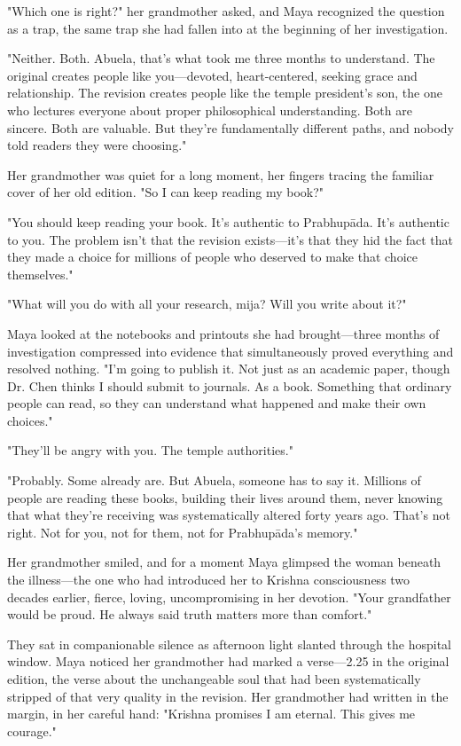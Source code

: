 \documentclass[12pt,twoside]{book}
\begin{document}
"Which one is right?" her grandmother asked, and Maya recognized the question as a trap, the same trap she had fallen into at the beginning of her investigation.

"Neither. Both. Abuela, that's what took me three months to understand. The original creates people like you—devoted, heart-centered, seeking grace and relationship. The revision creates people like the temple president's son, the one who lectures everyone about proper philosophical understanding. Both are sincere. Both are valuable. But they're fundamentally different paths, and nobody told readers they were choosing."

Her grandmother was quiet for a long moment, her fingers tracing the familiar cover of her old edition. "So I can keep reading my book?"

"You should keep reading your book. It's authentic to Prabhupāda. It's authentic to you. The problem isn't that the revision exists—it's that they hid the fact that they made a choice for millions of people who deserved to make that choice themselves."

"What will you do with all your research, mija? Will you write about it?"

Maya looked at the notebooks and printouts she had brought—three months of investigation compressed into evidence that simultaneously proved everything and resolved nothing. "I'm going to publish it. Not just as an academic paper, though Dr. Chen thinks I should submit to journals. As a book. Something that ordinary people can read, so they can understand what happened and make their own choices."

"They'll be angry with you. The temple authorities."

"Probably. Some already are. But Abuela, someone has to say it. Millions of people are reading these books, building their lives around them, never knowing that what they're receiving was systematically altered forty years ago. That's not right. Not for you, not for them, not for Prabhupāda's memory."

Her grandmother smiled, and for a moment Maya glimpsed the woman beneath the illness—the one who had introduced her to Krishna consciousness two decades earlier, fierce, loving, uncompromising in her devotion. "Your grandfather would be proud. He always said truth matters more than comfort."

They sat in companionable silence as afternoon light slanted through the hospital window. Maya noticed her grandmother had marked a verse—2.25 in the original edition, the verse about the unchangeable soul that had been systematically stripped of that very quality in the revision. Her grandmother had written in the margin, in her careful hand: "Krishna promises I am eternal. This gives me courage."
\end{document}
